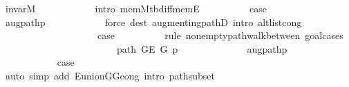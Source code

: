 \begin{isabellebody}
\ invar{\isacharunderscore}{\kern0pt}M\isanewline
\ \ \ \ \ \ \ \ \ \ \isamarkupfalse%
\ {\isacharparenleft}{\kern0pt}intro\ mem{\isacharunderscore}{\kern0pt}M{\isacharunderscore}{\kern0pt}tbd{\isacharunderscore}{\kern0pt}iff{\isacharunderscore}{\kern0pt}mem{\isacharunderscore}{\kern0pt}E{}{\isacharparenright}{\kern0pt}\isanewline
\ \ \ \ \ \ \ \ \isamarkupfalse%
\ {\isacharquery}{\kern0pt}case\isanewline
\ \ \ \ \ \ \ \ \ \ \isamarkupfalse%
\ augpath{\isacharunderscore}{\kern0pt}p{\isacharprime}{\kern0pt}\isanewline
\ \ \ \ \ \ \ \ \ \ \isamarkupfalse%
\ {\isacharparenleft}{\kern0pt}force\ dest{\isacharcolon}{\kern0pt}\ augmenting{\isacharunderscore}{\kern0pt}pathD{\isacharparenleft}{\kern0pt}{}{\isacharparenright}{\kern0pt}\ intro{\isacharcolon}{\kern0pt}\ alt{\isacharunderscore}{\kern0pt}list{\isacharunderscore}{\kern0pt}cong{\isacharparenright}{\kern0pt}\isanewline
\ \ \ \ \ \ \isamarkupfalse%
\isanewline
\ \ \ \ \ \ \ \ \isamarkupfalse%
\ {}\isanewline
\ \ \ \ \ \ \ \ \isamarkupfalse%
\ {\isacharquery}{\kern0pt}case\isanewline
\ \ \ \ \ \ \ \ \isamarkupfalse%
\ {\isacharparenleft}{\kern0pt}rule\ nonempty{\isacharunderscore}{\kern0pt}path{\isacharunderscore}{\kern0pt}walk{\isacharunderscore}{\kern0pt}between{\isacharcomma}{\kern0pt}\ goal{\isacharunderscore}{\kern0pt}cases{\isacharparenright}{\kern0pt}\isanewline
\ \ \ \ \ \ \ \ \ \ \isamarkupfalse%
\ {}\isanewline
\ \ \ \ \ \ \ \ \ \ \isamarkupfalse%
\ {\isachardoublequoteopen}path\ {\isacharparenleft}{\kern0pt}G{\isachardot}{\kern0pt}E\ G{\isacharparenright}{\kern0pt}\ p{\isacharprime}{\kern0pt}{\isachardoublequoteclose}\isanewline
\ \ \ \ \ \ \ \ \ \ \ \ \isamarkupfalse%
\ augpath{\isacharunderscore}{\kern0pt}p{\isacharprime}{\kern0pt}\isanewline
\ \ \ \ \ \ \ \ \ \ \ \ \isacommand{{\isachardot}{\kern0pt}{\isachardot}{\kern0pt}}\isamarkupfalse%
\isanewline
\ \ \ \ \ \ \ \ \ \ \isamarkupfalse%
\ {\isacharquery}{\kern0pt}case\isanewline
\ \ \ \ \ \ \ \ \ \ \ \ \isamarkupfalse%
\ {\isacharparenleft}{\kern0pt}auto\ simp\ add{\isacharcolon}{\kern0pt}\ E{\isacharunderscore}{\kern0pt}union{\isacharunderscore}{\kern0pt}G{}{\isacharunderscore}{\kern0pt}G{}{\isacharunderscore}{\kern0pt}cong\ intro{\isacharcolon}{\kern0pt}\ path{\isacharunderscore}{\kern0pt}subset{\isacharparenright}{\kern0pt}\isanewline
\ \ \ \ \ \ \ \ \isamarkupfalse%

\end{isabellebody}

